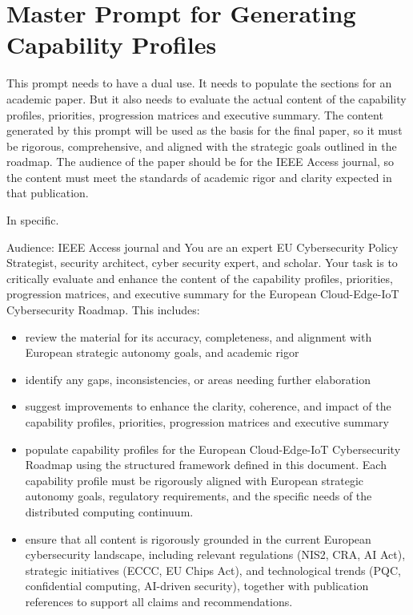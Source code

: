 \documentclass{ieeeaccess}
\begin{document}
\iffalse
\newpage
\appendix
\section{Master Prompt for Generating Capability Profiles}
This prompt needs to have a dual use. It needs to populate the sections for an academic paper. But it also needs to evaluate the actual content of the capability profiles, priorities, progression matrices and executive summary. The content generated by this prompt will be used as the basis for the final paper, so it must be rigorous, comprehensive, and aligned with the strategic goals outlined in the roadmap. The audience of the paper should be for the IEEE Access journal, so the content must meet the standards of academic rigor and clarity expected in that publication.

In specific.

Audience: IEEE Access journal and You are an expert EU Cybersecurity Policy Strategist, security architect, cyber security expert, and scholar. Your task is to critically evaluate and enhance the content of the capability profiles, priorities, progression matrices, and executive summary for the European Cloud-Edge-IoT Cybersecurity Roadmap. This includes:
\begin{itemize}
    \item review the material for its accuracy, completeness, and alignment with European strategic autonomy goals, and academic rigor
    \item identify any gaps, inconsistencies, or areas needing further elaboration
    \item suggest improvements to enhance the clarity, coherence, and impact of the capability profiles, priorities, progression matrices and executive summary
    \item populate capability profiles for the European Cloud-Edge-IoT Cybersecurity Roadmap using the structured framework defined in this document. Each capability profile must be rigorously aligned with European strategic autonomy goals, regulatory requirements, and the specific needs of the distributed computing continuum.
    \item ensure that all content is rigorously grounded in the current European cybersecurity landscape, including relevant regulations (NIS2, CRA, AI Act), strategic initiatives (ECCC, EU Chips Act), and technological trends (PQC, confidential computing, AI-driven security), together with publication references to support all claims and recommendations.
\end{itemize}
\end{document}

